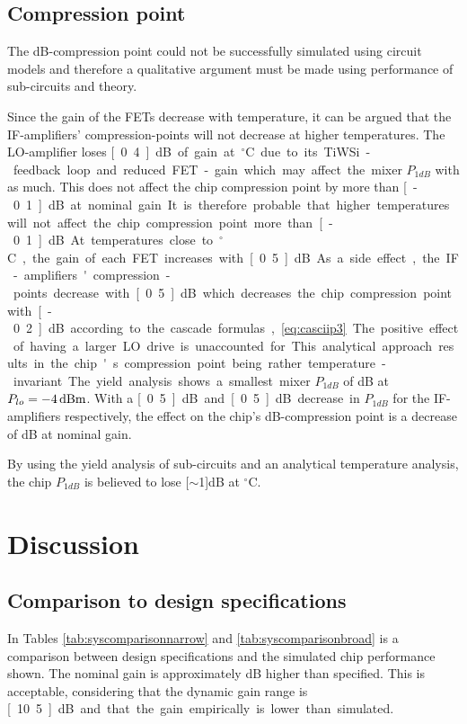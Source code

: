 		\subsection{Compression point}
		The \unit[1]{dB}-compression point could not be successfully simulated using circuit models and therefore a qualitative argument must be made using performance of sub-circuits and theory.
		
		Since the gain of the FETs decrease with temperature, it can be argued that the IF-amplifiers' compression-points will not decrease at higher temperatures. The LO-amplifier loses \unit[0.4]{dB} of gain at \unit[55]{$^\circ$C} due to its TiWSi-feedback loop and reduced FET-gain which may affect the mixer $P_{1dB}$ with as much. This does not affect the chip compression point by more than \unit[-0.1]{dB} at nominal gain. It is therefore probable that higher temperatures will not affect the chip compression point more than \unit[-0.1]{dB}. 
		
		At temperatures close to \unit[-40]{$^\circ$C}, the gain of each FET increases with \unit[0.5]{dB}. As a side effect, the IF-amplifiers' compression-points decrease with \unit[0.5]{dB} which decreases the chip compression point with \unit[-0.2]{dB} according to the cascade formulas, \autoref{eq:casciip3}. The positive effect of having a larger LO drive is unaccounted for.	This analytical approach results in the chip's compression point being rather temperature-invariant. The yield analysis shows a smallest mixer $P_{1dB}$ of \unit[10]{dB} at $P_{lo}=\unit[-4]{dBm}$. With a \unit[0.5]{dB} and \unit[0.5]{dB} decrease in $P_{1dB}$ for the IF-amplifiers respectively, the effect on the chip's \unit[1]{dB}-compression point is a decrease of \unit[1]{dB} at nominal gain.
		
		By using the yield analysis of sub-circuits and an analytical temperature analysis, the chip $P_{1dB}$ is believed to lose \unit[$\sim$1]{dB} at \unit[-40]{$^\circ$C}.

	
	\section{Discussion}
		\subsection{Comparison to design specifications}
			In Tables \ref{tab:syscomparisonnarrow} and \ref{tab:syscomparisonbroad} is a comparison between design specifications and the simulated chip performance shown. The nominal gain is approximately \unit[1]{dB} higher than specified. This is acceptable, considering that the dynamic gain range is \unit[10.5]{dB} and that the gain empirically is lower than simulated.
			

